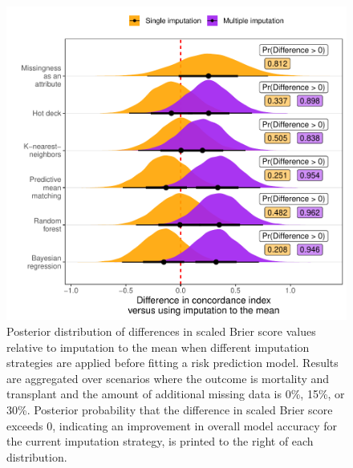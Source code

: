 \documentclass{article}
\begin{document}
\begin{figure}

{\centering \includegraphics{doc_arxiv_files/figure-latex/fig_md_strat_infer_auc-1} 

}

\caption{Posterior distribution of differences in scaled Brier score values relative to imputation to the mean when different imputation strategies are applied before fitting a risk prediction model. Results are aggregated over scenarios where the outcome is mortality and transplant and the amount of additional missing data is 0\%, 15\%, or 30\%. Posterior probability that the difference in scaled Brier score exceeds 0, indicating an improvement in overall model accuracy for the current imputation strategy, is printed to the right of each distribution.}\label{fig:fig_md_strat_infer_auc}
\end{figure}

\clearpage
\end{document}
